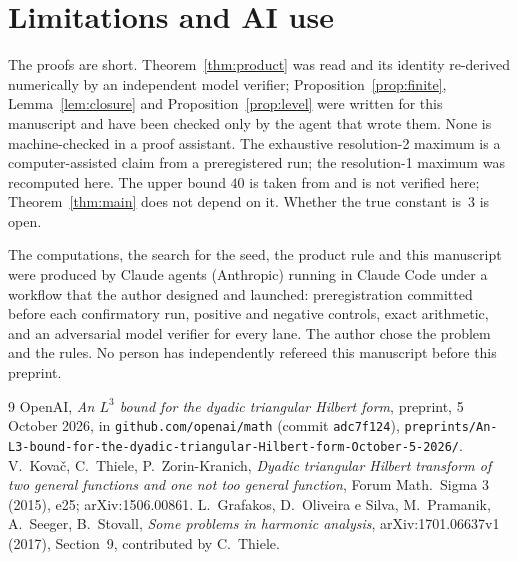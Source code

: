 \documentclass[11pt]{article}
\theoremstyle{remark}
\begin{document}
\section{Limitations and AI use}

The proofs are short. Theorem~\ref{thm:product} was read and its identity re-derived numerically by an independent
model verifier; Proposition~\ref{prop:finite}, Lemma~\ref{lem:closure} and Proposition~\ref{prop:level} were written
for this manuscript and have been checked only by the agent that wrote them. None is machine-checked in a proof
assistant. The exhaustive resolution-2 maximum is a computer-assisted claim from a preregistered run; the
resolution-1 maximum was recomputed here. The upper bound $40$ is taken from \cite{oai2026dyadic} and is not verified
here; Theorem~\ref{thm:main} does not depend on it. Whether the true constant is~3 is open.

The computations, the search for the seed, the product rule and this manuscript were produced by Claude agents (Anthropic)
running in Claude Code under a workflow that the author designed and launched: preregistration committed before each
confirmatory run, positive and negative controls, exact arithmetic, and an adversarial model verifier for every lane.
The author chose the problem and the rules. No person has independently refereed this manuscript before this preprint.

\begin{thebibliography}{9}
 OpenAI, \emph{An $L^3$ bound for the dyadic triangular Hilbert form}, preprint, 5 October 2026,
in \texttt{github.com/openai/math} (commit \texttt{adc7f124}), \texttt{preprints/An-L3-bound-for-the-dyadic-triangular-Hilbert-form-October-5-2026/}.
 V.~Kova\v{c}, C.~Thiele, P.~Zorin-Kranich, \emph{Dyadic triangular Hilbert transform of two general
functions and one not too general function}, Forum Math.\ Sigma 3 (2015), e25; arXiv:1506.00861.
 L.~Grafakos, D.~Oliveira e Silva, M.~Pramanik, A.~Seeger, B.~Stovall, \emph{Some problems in
harmonic analysis}, arXiv:1701.06637v1 (2017), Section~9, contributed by C.~Thiele.
\end{thebibliography}
\end{document}
